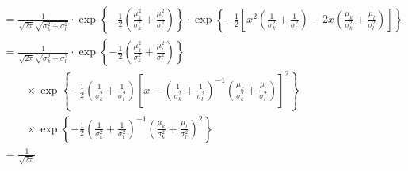 \documentclass[10pt]{article}
\begin{document}
\begin{appendices}
\begin{align*}
                              &= \frac{1}{\sqrt{2\pi}
                                \sqrt{\sigma^2_k+\sigma^2_l}} \cdot
                                \exp\left\{
                                -\frac{1}{2}\left(
                                \frac{\mu_k^2}{\sigma_k^2} +
                                \frac{\mu_l^2}{\sigma_l^2}
                                \right)
                                \right\} \cdot
                                \exp\left\{
                                -\frac{1}{2}\left[
                                x^2\left(\frac{1}{\sigma^2_k} +
                                \frac{1}{\sigma_l^2}\right) -
                                2x\left(\frac{\mu_k}{\sigma^2_k} +
                                \frac{\mu_l}{\sigma^2_l}\right)
                                \right]\right\} \\
                              &=\frac{1}{\sqrt{2\pi}
                                \sqrt{\sigma^2_k+\sigma^2_l}} \cdot
                                \exp\left\{
                                -\frac{1}{2}\left(
                                \frac{\mu_k^2}{\sigma_k^2} +
                                \frac{\mu_l^2}{\sigma_l^2}
                                \right)
                                \right\} \\
                              &\qquad \times \exp\left\{
                                -\frac{1}{2}
                                \left(\frac{1}{\sigma^2_k} +
                                \frac{1}{\sigma_l^2}\right)
                                \left[
                                x -
                                \left(\frac{1}{\sigma^2_k} +
                                \frac{1}{\sigma_l^2}\right)^{-1}
                                \left(\frac{\mu_k}{\sigma^2_k} +
                                \frac{\mu_l}{\sigma^2_l}\right)
                                \right]^2\right\} \\
                              &\qquad \times \exp\left\{
                                -\frac{1}{2}
                                \left(\frac{1}{\sigma^2_k} +
                                \frac{1}{\sigma_l^2}\right)^{-1}
                                \left(\frac{\mu_k}{\sigma^2_k} +
                                \frac{\mu_l}{\sigma^2_l}\right)^2
                                \right\} \\
                              &=\frac{1}{\sqrt{2\pi}
}
\end{align*}
\end{appendices}
\end{document}
